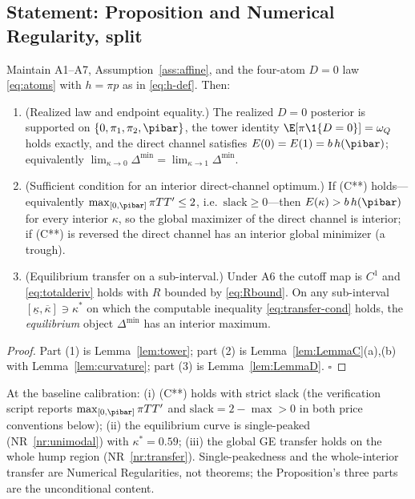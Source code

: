 \subsection*{Statement: Proposition and Numerical Regularity, split}

\begin{proposition}
\label{prop:six-new}
Maintain A1--A7, Assumption~\ref{ass:affine}, and the four-atom $D=0$ law
\eqref{eq:atoms} with $h=\pi p$ as in \eqref{eq:h-def}. Then:
\begin{enumerate}
\item \textup{(Realized law and endpoint equality.)} The realized $D=0$
posterior is supported on $\{0,\pi_1,\pi_2,\pibar\}$, the tower identity
$\E[\pi\1\{D=0\}]=\omega_Q$ holds exactly, and the direct channel satisfies
$E(0)=E(1)=b\,h(\pibar)$; equivalently
$\lim_{\kappa\to0}\Delta^{\min}=\lim_{\kappa\to1}\Delta^{\min}$.
\item \textup{(Sufficient condition for an interior direct-channel optimum.)}
If \textup{(C**)} holds---equivalently $\max_{[0,\pibar]}\pi T T'\le2$, i.e.\
$\mathrm{slack}\ge0$---then $E(\kappa)>b\,h(\pibar)$ for every interior
$\kappa$, so the global maximizer of the direct channel is interior; if
\textup{(C**) is reversed} the direct channel has an interior global minimizer
(a trough).
\item \textup{(Equilibrium transfer on a sub-interval.)} Under A6 the cutoff
map is $C^1$ and \eqref{eq:totalderiv} holds with $R$ bounded by
\eqref{eq:Rbound}. On any sub-interval
$[\underline\kappa,\overline\kappa]\ni\kappa^\ast$ on which the computable
inequality \eqref{eq:transfer-cond} holds, the \emph{equilibrium} object
$\Delta^{\min}$ has an interior maximum.
\end{enumerate}
\end{proposition}

\begin{proof}
Part (1) is Lemma~\ref{lem:tower}; part (2) is
Lemma~\ref{lem:LemmaC}(a),(b) with Lemma~\ref{lem:curvature}; part (3) is
Lemma~\ref{lem:LemmaD}. \hfill$\square$
\end{proof}

\begin{numreg}[Baseline realization of Proposition~\ref{prop:six-new}]
\label{nr:baseline}
At the baseline calibration: (i) (C**) holds with strict slack (the
verification script reports $\max_{[0,\pibar]}\pi T T'$ and
$\mathrm{slack}=2-\max>0$ in both price conventions below); (ii) the
equilibrium curve is single-peaked (NR~\ref{nr:unimodal}) with
$\kappa^\ast=0.59$; (iii) the global GE transfer holds on the whole hump region
(NR~\ref{nr:transfer}). Single-peakedness and the whole-interior transfer are
Numerical Regularities, not theorems; the Proposition's three parts are the
unconditional content.
\end{numreg}

